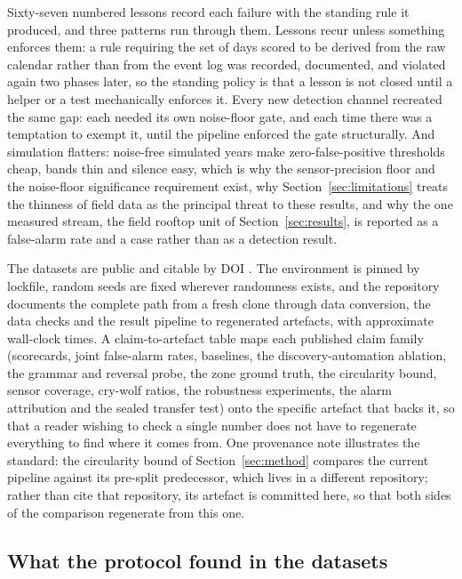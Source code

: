 \documentclass[11pt,letterpaper]{article}
\begin{document}
Sixty-seven numbered lessons record each failure with the standing rule it produced, and three patterns run through them. Lessons recur unless something enforces them: a rule requiring the set of days scored to be derived from the raw calendar rather than from the event log was recorded, documented, and violated again two phases later, so the standing policy is that a lesson is not closed until a helper or a test mechanically enforces it. Every new detection channel recreated the same gap: each needed its own noise-floor gate, and each time there was a temptation to exempt it, until the pipeline enforced the gate structurally. And simulation flatters: noise-free simulated years make zero-false-positive thresholds cheap, bands thin and silence easy, which is why the sensor-precision floor and the noise-floor significance requirement exist, why Section~\ref{sec:limitations} treats the thinness of field data as the principal threat to these results, and why the one measured stream, the field rooftop unit of Section~\ref{sec:results}, is reported as a false-alarm rate and a case rather than as a detection result.

The datasets are public and citable by DOI \cite{granderson2020lbnlfdddata,granderson2022lbnlfdddatasets,granderson2023lbnlfdddata}. The environment is pinned by lockfile, random seeds are fixed wherever randomness exists, and the repository documents the complete path from a fresh clone through data conversion, the data checks and the result pipeline to regenerated artefacts, with approximate wall-clock times. A claim-to-artefact table maps each published claim family (scorecards, joint false-alarm rates, baselines, the discovery-automation ablation, the grammar and reversal probe, the zone ground truth, the circularity bound, sensor coverage, cry-wolf ratios, the robustness experiments, the alarm attribution and the sealed transfer test) onto the specific artefact that backs it, so that a reader wishing to check a single number does not have to regenerate everything to find where it comes from. One provenance note illustrates the standard: the circularity bound of Section~\ref{sec:method} compares the current pipeline against its pre-split predecessor, which lives in a different repository; rather than cite that repository, its artefact is committed here, so that both sides of the comparison regenerate from this one.

\subsection{What the protocol found in the datasets}
\label{sec:errata}
\end{document}
